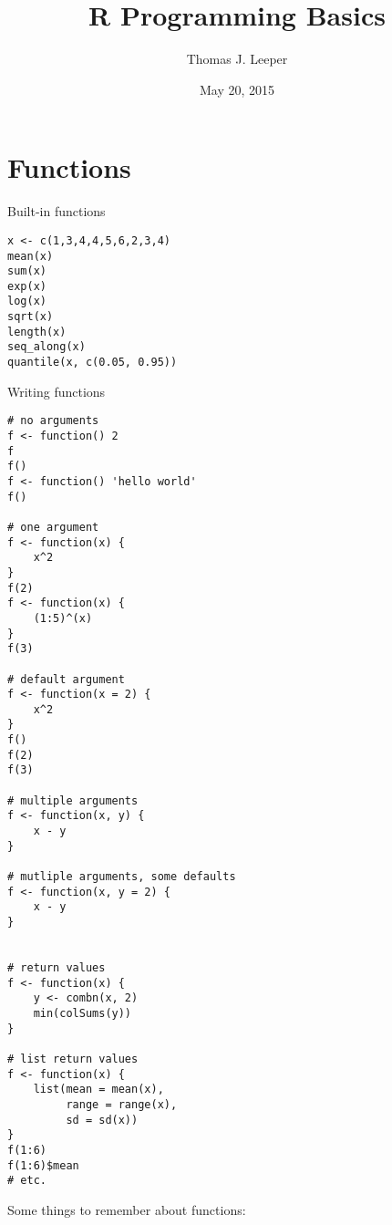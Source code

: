 \documentclass[a4paper,12pt]{article}
\title{R Programming Basics}
\author{Thomas J. Leeper}
\date{May 20, 2015}
\begin{document}
\maketitle

\doublespacing


\section{Functions}

Built-in functions

\begin{lstlisting}
x <- c(1,3,4,4,5,6,2,3,4)
mean(x)
sum(x)
exp(x)
log(x)
sqrt(x)
length(x)
seq_along(x)
quantile(x, c(0.05, 0.95))
\end{lstlisting}




Writing functions


\begin{lstlisting}
# no arguments
f <- function() 2
f
f()
f <- function() 'hello world'
f()

# one argument
f <- function(x) {
    x^2
}
f(2)
f <- function(x) {
    (1:5)^(x)
}
f(3)

# default argument
f <- function(x = 2) {
    x^2
}
f()
f(2)
f(3)

# multiple arguments
f <- function(x, y) {
    x - y
}

# mutliple arguments, some defaults
f <- function(x, y = 2) {
    x - y
}


# return values
f <- function(x) {
    y <- combn(x, 2)
    min(colSums(y))
}

# list return values
f <- function(x) {
    list(mean = mean(x),
         range = range(x),
         sd = sd(x))
}
f(1:6)
f(1:6)$mean
# etc.

\end{lstlisting}

Some things to remember about functions:
\end{document}
